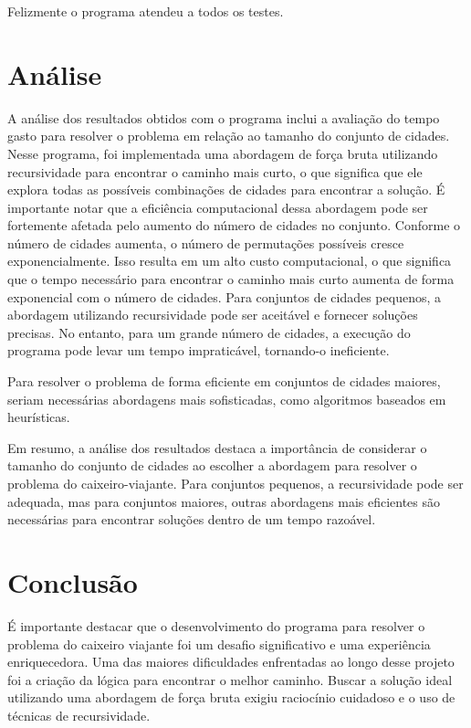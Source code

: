 \documentclass[12pt]{spieman}
\begin{document}
Felizmente o programa atendeu a todos os testes.


\section{Análise}

A análise dos resultados obtidos com o programa inclui a avaliação do tempo gasto para resolver o problema em relação ao tamanho do conjunto de cidades. Nesse programa, foi implementada uma abordagem de força bruta utilizando recursividade para encontrar o caminho mais curto, o que significa que ele explora todas as possíveis combinações de cidades para encontrar a solução.
É importante notar que a eficiência computacional dessa abordagem pode ser fortemente afetada pelo aumento do número de cidades no conjunto. Conforme o número de cidades aumenta, o número de permutações possíveis cresce exponencialmente.
Isso resulta em um alto custo computacional, o que significa que o tempo necessário para encontrar o caminho mais curto aumenta de forma exponencial com o número de cidades. Para conjuntos de cidades pequenos, a abordagem utilizando recursividade pode ser aceitável e fornecer soluções precisas. No entanto, para um grande número de cidades, a execução do programa pode levar um tempo impraticável, tornando-o ineficiente.

Para resolver o problema de forma eficiente em conjuntos de cidades maiores, seriam necessárias abordagens mais sofisticadas, como algoritmos baseados em heurísticas. 

Em resumo, a análise dos resultados destaca a importância de considerar o tamanho do conjunto de cidades ao escolher a abordagem para resolver o problema do caixeiro-viajante. Para conjuntos pequenos, a recursividade pode ser adequada, mas para conjuntos maiores, outras abordagens mais eficientes são necessárias para encontrar soluções dentro de um tempo razoável.

\section{Conclusão}
É importante destacar que o desenvolvimento do programa para resolver o problema do caixeiro viajante foi um desafio significativo e uma experiência enriquecedora. Uma das maiores dificuldades enfrentadas ao longo desse projeto foi a criação da lógica para encontrar o melhor caminho. Buscar a solução ideal utilizando uma abordagem de força bruta exigiu raciocínio cuidadoso e o uso de técnicas de recursividade.
\end{document}

